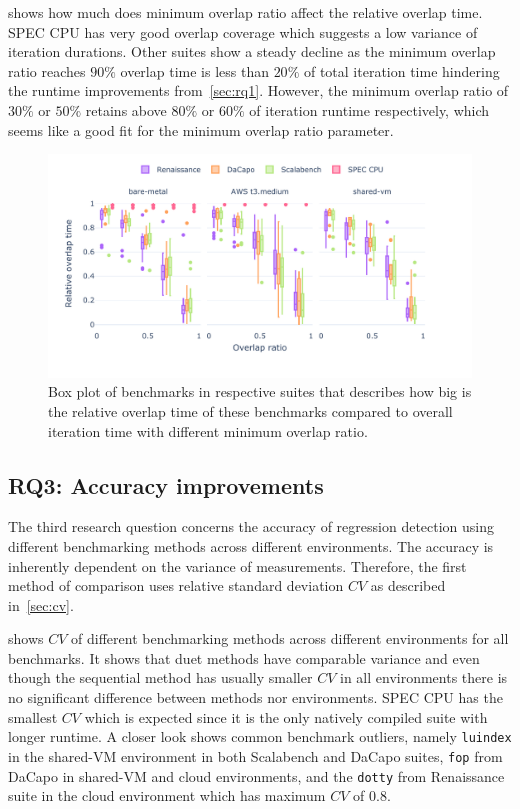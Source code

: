  shows how much does minimum overlap ratio affect the relative overlap time.
SPEC CPU has very good overlap coverage which suggests a low variance of iteration durations.
Other suites show a steady decline as the minimum overlap ratio reaches $90\%$ overlap time is less than $20\%$ of total iteration time hindering the runtime improvements from~\cref{sec:rq1}.
However, the minimum overlap ratio of $30\%$ or $50\%$ retains above $80\%$ or $60\%$ of iteration runtime respectively, which seems like a good fit for the minimum overlap ratio parameter.

\begin{figure}
	\centering
	\includegraphics[width=1\linewidth]{./figures/relative_overlap_time.pdf}
	\caption{
		Box plot of benchmarks in respective suites that describes how big is the relative overlap time of these benchmarks compared to overall iteration time with different minimum overlap ratio.
	}
	\label{fig:relative_overlap_time}
\end{figure}


\subsection{RQ3: Accuracy improvements}
\label{sec:rq3}

The third research question concerns the accuracy of regression detection using different benchmarking methods across different environments.
The accuracy is inherently dependent on the variance of measurements.
Therefore, the first method of comparison uses relative standard deviation $CV$ as described in~\cref{sec:cv}.

 shows $CV$ of different benchmarking methods across different environments for all benchmarks.
It shows that duet methods have comparable variance and even though the sequential method has usually smaller $CV$ in all environments there is no significant difference between methods nor environments.
SPEC CPU has the smallest $CV$ which is expected since it is the only natively compiled suite with longer runtime.
A closer look shows common benchmark outliers, namely \lstinline{luindex} in the \mbox{shared-VM} environment in both Scalabench and DaCapo suites, \lstinline{fop} from DaCapo in \mbox{shared-VM} and cloud environments, and the \lstinline{dotty} from Renaissance suite in the cloud environment which has maximum $CV$ of $0.8$.


